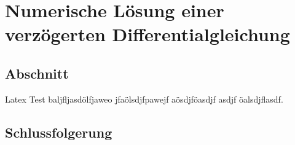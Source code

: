 %
%
%
\chapter{Numerische Lösung einer verzögerten Differentialgleichung\label{chapter:verzoegert}}
\begin{refsection}

\section{Abschnitt}
Latex Test baljfljasdölfjaweo jfaölsdjfpawejf aösdjföasdjf asdjf öalsdjflasdf.

\section{Schlussfolgerung}

\printbibliography[heading=subbibliography]
\end{refsection}
